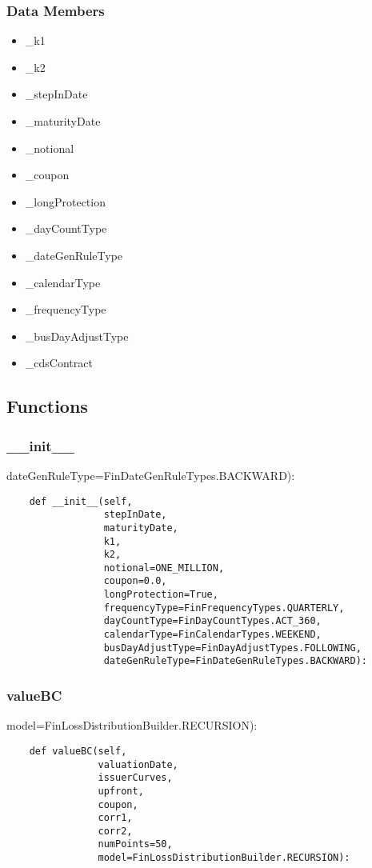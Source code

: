 \documentclass[twoside,11pt]{book}
\begin{document}
\subsubsection*{Data Members}
\begin{itemize}
\item{\_k1}
\item{\_k2}
\item{\_stepInDate}
\item{\_maturityDate}
\item{\_notional}
\item{\_coupon}
\item{\_longProtection}
\item{\_dayCountType}
\item{\_dateGenRuleType}
\item{\_calendarType}
\item{\_frequencyType}
\item{\_busDayAdjustType}
\item{\_cdsContract}
\end{itemize}

\subsection*{Functions}

\subsubsection*{{\bf \_\_init\_\_}}
dateGenRuleType=FinDateGenRuleTypes.BACKWARD): 

\begin{lstlisting}
    def __init__(self,
                 stepInDate,
                 maturityDate,
                 k1,
                 k2,
                 notional=ONE_MILLION,
                 coupon=0.0,
                 longProtection=True,
                 frequencyType=FinFrequencyTypes.QUARTERLY,
                 dayCountType=FinDayCountTypes.ACT_360,
                 calendarType=FinCalendarTypes.WEEKEND,
                 busDayAdjustType=FinDayAdjustTypes.FOLLOWING,
                 dateGenRuleType=FinDateGenRuleTypes.BACKWARD):
\end{lstlisting}

\subsubsection*{{\bf valueBC}}
model=FinLossDistributionBuilder.RECURSION): 

\begin{lstlisting}
    def valueBC(self,
                valuationDate,
                issuerCurves,
                upfront,
                coupon,
                corr1,
                corr2,
                numPoints=50,
                model=FinLossDistributionBuilder.RECURSION):
\end{lstlisting}
\end{document}
